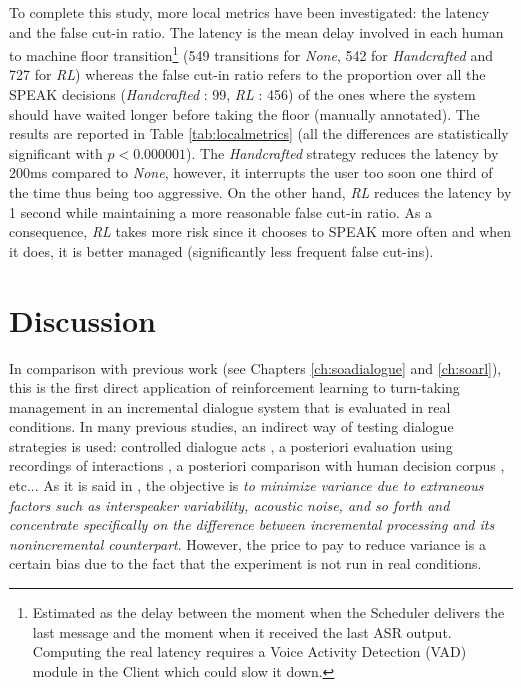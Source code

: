         To complete this study, more local metrics have been investigated: the latency and the false cut-in ratio. The latency is the mean delay involved in each human to machine floor transition\footnote{Estimated as the delay between the moment when the Scheduler delivers the last message and the moment when it received the last ASR output. Computing the real latency requires a Voice Activity Detection (VAD) module in the Client which could slow it down.} (549 transitions for \textit{None}, 542 for \textit{Handcrafted} and 727 for \textit{RL}) whereas the false cut-in ratio refers to the proportion over all the SPEAK decisions (\textit{Handcrafted} : 99, \textit{RL} : 456) of the ones where the system should have waited longer before taking the floor (manually annotated). The results are reported in Table \ref{tab:localmetrics} (all the differences are statistically significant with $p < 0.000001$). The \textit{Handcrafted} strategy reduces the latency by 200ms compared to \textit{None}, however, it interrupts the user too soon one third of the time thus being too aggressive. On the other hand, \textit{RL} reduces the latency by 1 second while maintaining a more reasonable false cut-in ratio. As a consequence, \textit{RL} takes more risk since it chooses to SPEAK more often and when it does, it is better managed (significantly less frequent false cut-ins).

\section{Discussion}

        In comparison with previous work (see Chapters \ref{ch:soadialogue} and \ref{ch:soarl}), this is the first direct application of reinforcement learning to turn-taking management in an incremental dialogue system that is evaluated in real conditions. In many previous studies, an indirect way of testing dialogue strategies is used: controlled dialogue acts \cite{Aist2007}, a posteriori evaluation using recordings of interactions \cite{Meena2013}, a posteriori comparison with human decision corpus \cite{Jonsdottir2008,Dethlefs2012}, etc... As it is said in \cite{Aist2007}, the objective is \textit{to minimize variance due to extraneous factors such as interspeaker variability, acoustic noise, and so forth and concentrate specifically on the difference between incremental processing and its nonincremental counterpart}. However, the price to pay to reduce variance is a certain bias due to the fact that the experiment is not run in real conditions.

